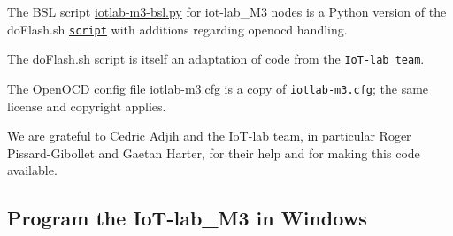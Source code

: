 The B\+SL script {\ttfamily \hyperlink{iotlab-m3-bsl_8py}{iotlab-\/m3-\/bsl.\+py}} for iot-\/lab\+\_\+\+M3 nodes is a Python version of the {\ttfamily do\+Flash.\+sh} \href{https://github.com/adjih/exp-iotlab/blob/master/tools/misc/doFlash.sh}{\tt script} with additions regarding {\ttfamily openocd} handling.

The {\ttfamily do\+Flash.\+sh} script is itself an adaptation of code from the \href{https://github.com/iot-lab/openlab/tree/master/platform}{\tt Io\+T-\/lab team}.

The Open\+O\+CD config file {\ttfamily iotlab-\/m3.\+cfg} is a copy of \href{https://github.com/iot-lab/openlab/blob/master/platform/scripts/iotlab-m3.cfg}{\tt iotlab-\/m3.\+cfg}; the same license and copyright applies.

We are grateful to Cedric Adjih and the Io\+T-\/lab team, in particular Roger Pissard-\/\+Gibollet and Gaetan Harter, for their help and for making this code available.

\subsection*{Program the Io\+T-\/lab\+\_\+\+M3 in Windows }


